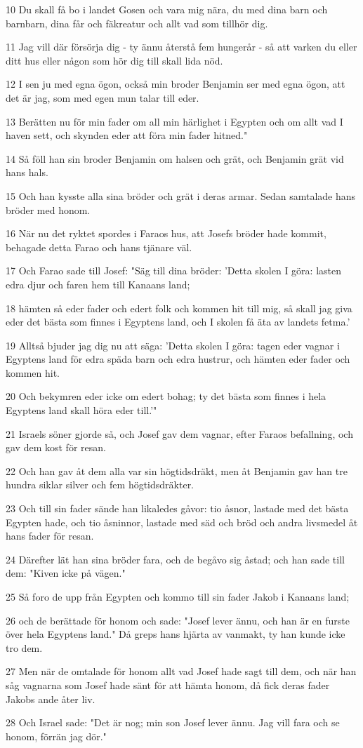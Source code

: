 \par 10 Du skall få bo i landet Gosen och vara mig nära, du med dina barn och barnbarn, dina får och fäkreatur och allt vad som tillhör dig.
\par 11 Jag vill där försörja dig - ty ännu återstå fem hungerår - så att varken du eller ditt hus eller någon som hör dig till skall lida nöd.
\par 12 I sen ju med egna ögon, också min broder Benjamin ser med egna ögon, att det är jag, som med egen mun talar till eder.
\par 13 Berätten nu för min fader om all min härlighet i Egypten och om allt vad I haven sett, och skynden eder att föra min fader hitned."
\par 14 Så föll han sin broder Benjamin om halsen och grät, och Benjamin grät vid hans hals.
\par 15 Och han kysste alla sina bröder och grät i deras armar. Sedan samtalade hans bröder med honom.
\par 16 När nu det ryktet spordes i Faraos hus, att Josefs bröder hade kommit, behagade detta Farao och hans tjänare väl.
\par 17 Och Farao sade till Josef: "Säg till dina bröder: 'Detta skolen I göra: lasten edra djur och faren hem till Kanaans land;
\par 18 hämten så eder fader och edert folk och kommen hit till mig, så skall jag giva eder det bästa som finnes i Egyptens land, och I skolen få äta av landets fetma.'
\par 19 Alltså bjuder jag dig nu att säga: 'Detta skolen I göra: tagen eder vagnar i Egyptens land för edra späda barn och edra hustrur, och hämten eder fader och kommen hit.
\par 20 Och bekymren eder icke om edert bohag; ty det bästa som finnes i hela Egyptens land skall höra eder till.'"
\par 21 Israels söner gjorde så, och Josef gav dem vagnar, efter Faraos befallning, och gav dem kost för resan.
\par 22 Och han gav åt dem alla var sin högtidsdräkt, men åt Benjamin gav han tre hundra siklar silver och fem högtidsdräkter.
\par 23 Och till sin fader sände han likaledes gåvor: tio åsnor, lastade med det bästa Egypten hade, och tio åsninnor, lastade med säd och bröd och andra livsmedel åt hans fader för resan.
\par 24 Därefter lät han sina bröder fara, och de begåvo sig åstad; och han sade till dem: "Kiven icke på vägen."
\par 25 Så foro de upp från Egypten och kommo till sin fader Jakob i Kanaans land;
\par 26 och de berättade för honom och sade: "Josef lever ännu, och han är en furste över hela Egyptens land." Då greps hans hjärta av vanmakt, ty han kunde icke tro dem.
\par 27 Men när de omtalade för honom allt vad Josef hade sagt till dem, och när han såg vagnarna som Josef hade sänt för att hämta honom, då fick deras fader Jakobs ande åter liv.
\par 28 Och Israel sade: "Det är nog; min son Josef lever ännu. Jag vill fara och se honom, förrän jag dör."

